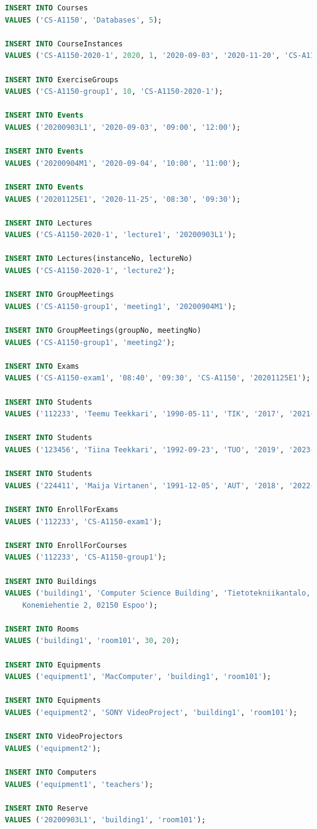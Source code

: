 \documentclass{article}
\begin{document}
\begin{lstlisting}[language=SQL]
INSERT INTO Courses
VALUES ('CS-A1150', 'Databases', 5);

INSERT INTO CourseInstances
VALUES ('CS-A1150-2020-1', 2020, 1, '2020-09-03', '2020-11-20', 'CS-A1150');

INSERT INTO ExerciseGroups
VALUES ('CS-A1150-group1', 10, 'CS-A1150-2020-1');

INSERT INTO Events
VALUES ('20200903L1', '2020-09-03', '09:00', '12:00');

INSERT INTO Events
VALUES ('20200904M1', '2020-09-04', '10:00', '11:00');

INSERT INTO Events
VALUES ('20201125E1', '2020-11-25', '08:30', '09:30');

INSERT INTO Lectures
VALUES ('CS-A1150-2020-1', 'lecture1', '20200903L1');

INSERT INTO Lectures(instanceNo, lectureNo)
VALUES ('CS-A1150-2020-1', 'lecture2');

INSERT INTO GroupMeetings
VALUES ('CS-A1150-group1', 'meeting1', '20200904M1');

INSERT INTO GroupMeetings(groupNo, meetingNo)
VALUES ('CS-A1150-group1', 'meeting2');

INSERT INTO Exams
VALUES ('CS-A1150-exam1', '08:40', '09:30', 'CS-A1150', '20201125E1');

INSERT INTO Students
VALUES ('112233', 'Teemu Teekkari', '1990-05-11', 'TIK', '2017', '2021-08-30');

INSERT INTO Students
VALUES ('123456', 'Tiina Teekkari', '1992-09-23', 'TUO', '2019', '2023-08-30');

INSERT INTO Students
VALUES ('224411', 'Maija Virtanen', '1991-12-05', 'AUT', '2018', '2022-08-30');

INSERT INTO EnrollForExams
VALUES ('112233', 'CS-A1150-exam1');

INSERT INTO EnrollForCourses
VALUES ('112233', 'CS-A1150-group1');

INSERT INTO Buildings
VALUES ('building1', 'Computer Science Building', 'Tietotekniikantalo, 
	Konemiehentie 2, 02150 Espoo');

INSERT INTO Rooms
VALUES ('building1', 'room101', 30, 20);

INSERT INTO Equipments
VALUES ('equipment1', 'MacComputer', 'building1', 'room101');

INSERT INTO Equipments
VALUES ('equipment2', 'SONY VideoProject', 'building1', 'room101');

INSERT INTO VideoProjectors
VALUES ('equipment2');

INSERT INTO Computers
VALUES ('equipment1', 'teachers');

INSERT INTO Reserve
VALUES ('20200903L1', 'building1', 'room101');
\end{lstlisting}
\end{document}

